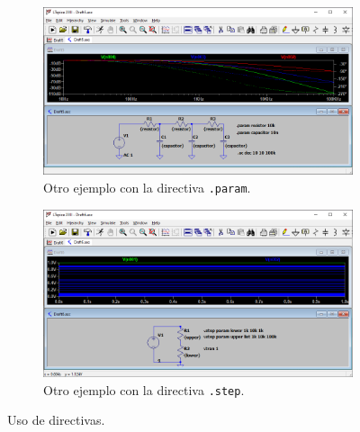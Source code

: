 \documentclass[a4paper]{article} %
\begin{document}
\begin{figure}
	\centering
	\begin{subfigure}[b]{0.45\textwidth}
		\centering %
		\includegraphics[scale=0.3]{IMAGENES/img13} %
		\caption{Otro ejemplo con la directiva \texttt{.param}.} %
		\label{img13} %
	\end{subfigure}
	\hfill
	\begin{subfigure}[b]{0.45\textwidth}
		\centering %
		\includegraphics[scale=0.3]{IMAGENES/img14} %
		\caption{Otro ejemplo con la directiva \texttt{.step}.} %
		\label{img14} %
	\end{subfigure}
	\caption{Uso de directivas.}
	\label{fuentes13y14}
\end{figure}
\end{document}
